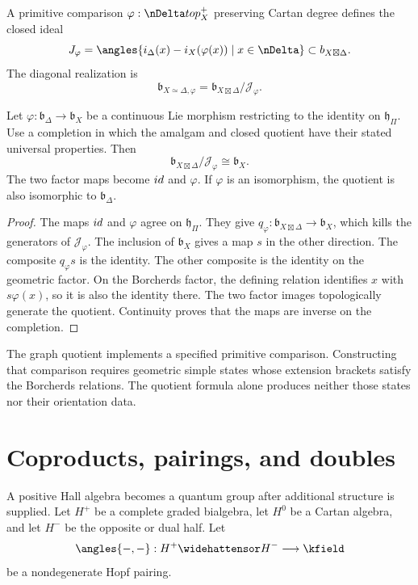 \begin{definition}
A primitive comparison $\varphi:\nDelta\to\mathfrak p_X^+$ preserving Cartan degree defines the closed ideal
\[
 \mathcal J_\varphi
 =\overline{\angles{
   i_\Delta(x)-i_X(\varphi(x))\mid x\in\nDelta
 }}
 \subset\mathfrak b_{X\boxtimes\Delta}.
\]
The diagonal realization is
\[
 \mathfrak b_{X\simeq\Delta,\varphi}
 =\mathfrak b_{X\boxtimes\Delta}/\mathcal J_\varphi.
\]
\end{definition}

\begin{proposition}\label{cyiv:graph-quotient}
Let $\varphi:\mathfrak b_\Delta\to\mathfrak b_X$ be a continuous Lie
morphism restricting to the identity on $\mathfrak h_\Pi$.
Use a completion in which the amalgam and closed quotient have
their stated universal properties.
Then
\[
 \mathfrak b_{X\boxtimes\Delta}/\mathcal J_\varphi
 \cong\mathfrak b_X.
\]
The two factor maps become $id$ and $\varphi$.
If $\varphi$ is an isomorphism, the quotient is also isomorphic
to $\mathfrak b_\Delta$.
\end{proposition}
\begin{proof}
The maps $id$ and $\varphi$ agree on $\mathfrak h_\Pi$.
They give $q_\varphi:\mathfrak b_{X\boxtimes\Delta}\to\mathfrak b_X$,
which kills the generators of $\mathcal J_\varphi$.
The inclusion of $\mathfrak b_X$ gives a map $s$ in the other direction.
The composite $q_\varphi s$ is the identity.
The other composite is the identity on the geometric factor.
On the Borcherds factor, the defining relation identifies $x$ with
$s\varphi(x)$, so it is also the identity there.
The two factor images topologically generate the quotient.
Continuity proves that the maps are inverse on the completion.
\end{proof}

The graph quotient implements a specified primitive comparison.
Constructing that comparison requires geometric simple states whose
extension brackets satisfy the Borcherds relations.
The quotient formula alone produces neither those states nor their
orientation data.

\chapter{Coproducts, pairings, and doubles}
A positive Hall algebra becomes a quantum group after additional structure is supplied. Let $H^+$ be a complete graded bialgebra, let $H^0$ be a Cartan algebra, and let $H^-$ be the opposite or dual half. Let
\[
 \angles{-,-}:H^+\widehattensor H^-\longrightarrow\kfield
\]
be a nondegenerate Hopf pairing.

